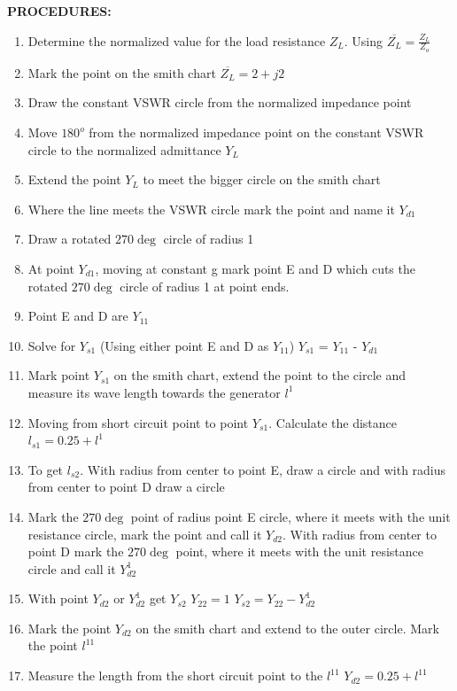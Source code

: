 \begin{exmp}
\textbf{PROCEDURES:}
\begin{enumerate}
\item Determine the normalized value for the load resistance $Z_{L}$. Using $\overline{Z_{L}} = \frac{Z_{L}}{Z_{o}}$ 
\item Mark the point on the smith chart $\overline{Z_{L}} = 2 + j2$   
\item Draw the constant VSWR circle from the normalized impedance point
\item Move $180^{o}$ from the normalized impedance point on the constant VSWR circle to the normalized admittance $Y_{L}$
\item Extend the point $Y_{L}$ to meet the bigger circle on the smith chart 
\item Where the line meets the VSWR circle mark the point and name it $Y_{d1}$                       
\item Draw a rotated $270\deg $ circle of radius 1                                                  
\item At point $Y_{d1}$, moving at constant g mark point E and D which cuts the rotated $270\deg $ circle of radius 1 at point ends.
\item Point E and D are $Y_{11}$                                                
\item Solve for $Y_{s1}$ (Using either point E and D as $Y_{11}$) $Y_{s1}$ =    $Y_{11}$ -    $Y_{d1}$                     
\item Mark point $Y_{s1}$ on the smith chart, extend the point to the circle and measure its wave length  towards the generator $l^{1}$ 
\item Moving from short circuit point to point $Y_{s1}$. Calculate the distance
$ l_{s1} = 0.25 + l^{1} $                                                                        
\item To get $l_{s2}$. With radius from center to point E, draw a circle and with radius from center to point D draw a circle
\item Mark the $270\deg$ point of radius point E circle, where it meets with the unit resistance circle, mark the point and call it $Y_{d2}$. With radius from center to point D mark the $270\deg$ point, where it meets with the unit resistance circle and call it $Y_{d2}^{1}$ 
\item With point $Y_{d2}$ or $Y_{d2}^{1}$ get $Y_{s2}$ $Y_{22}=1$ $Y_{s2}=Y_{22}-Y_{d2}^{1}$
\item Mark the point $Y_{d2}$ on the smith chart and extend to the outer circle. Mark the point $l^{11}$
\item Measure the length from the short circuit point to the $l^{11}$ $Y_{d2} = 0.25 + l^{11}$
\end{enumerate}
\end{exmp}

